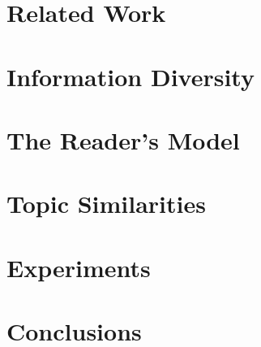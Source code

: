 \documentclass{article}
\begin{document}

\section{Related Work}
\label{sec:related-work}


\section{Information Diversity}
\label{sec:information-diversity}




\section{The Reader's Model}
\label{sec:the-readers-model}


\section{Topic Similarities}
\label{sec:topic-similarities}



\section{Experiments}
\label{sec:experiments}


\section{Conclusions}
\label{sec:conclusions}

\end{document}
